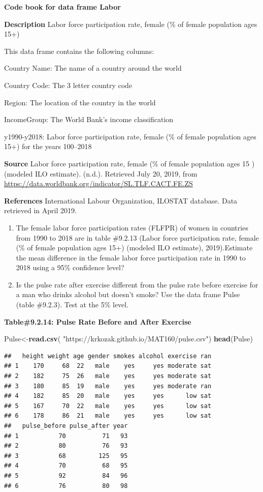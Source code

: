 \documentclass[
]{book}
\newenvironment{Shaded}{\begin{snugshade}}{\end{snugshade}}
\newcommand{\KeywordTok}[1]{\textcolor[rgb]{0.13,0.29,0.53}{\textbf{#1}}}
\newcommand{\NormalTok}[1]{#1}
\newcommand{\StringTok}[1]{\textcolor[rgb]{0.31,0.60,0.02}{#1}}
\begin{document}
\textbf{Code book for data frame Labor}

\textbf{Description}
Labor force participation rate, female (\% of female population ages 15+)

This data frame contains the following columns:

Country Name: The name of a country around the world

Country Code: The 3 letter country code

Region: The location of the country in the world

IncomeGroup: The World Bank's income classification

y1990-y2018: Labor force participation rate, female (\% of female population ages 15+) for the years 100--2018

\textbf{Source}
Labor force participation rate, female (\% of female population ages 15 ) (modeled ILO estimate). (n.d.). Retrieved July 20, 2019, from \url{https://data.worldbank.org/indicator/SL.TLF.CACT.FE.ZS}

\textbf{References}
International Labour Organization, ILOSTAT database. Data retrieved in April 2019.

\begin{enumerate}
\def\labelenumi{\arabic{enumi}.}
\setcounter{enumi}{9}
\item
  The female labor force participation rates (FLFPR) of women in countries from 1990 to 2018 are in table \#9.2.13 (Labor force participation rate, female (\% of female population ages 15+) (modeled ILO estimate), 2019).Estimate the mean difference in the female labor force participation rate in 1990 to 2018 using a 95\% confidence level?
\item
  Is the pulse rate after exercise different from the pulse rate before exercise for a man who drinks alcohol but doesn't smoke? Use the data frame Pulse (table \#9.2.3). Test at the 5\% level.
\end{enumerate}

\textbf{Table\#9.2.14: Pulse Rate Before and After Exercise}

\begin{Shaded}
\begin{Highlighting}[]
\NormalTok{Pulse<-}\KeywordTok{read.csv}\NormalTok{(}
  \StringTok{"https://krkozak.github.io/MAT160/pulse.csv"}\NormalTok{)}
\KeywordTok{head}\NormalTok{(Pulse)}
\end{Highlighting}
\end{Shaded}

\begin{verbatim}
##   height weight age gender smokes alcohol exercise ran
## 1    170     68  22   male    yes     yes moderate sat
## 2    182     75  26   male    yes     yes moderate sat
## 3    180     85  19   male    yes     yes moderate ran
## 4    182     85  20   male    yes     yes      low sat
## 5    167     70  22   male    yes     yes      low sat
## 6    178     86  21   male    yes     yes      low sat
##   pulse_before pulse_after year
## 1           70          71   93
## 2           80          76   93
## 3           68         125   95
## 4           70          68   95
## 5           92          84   96
## 6           76          80   98
\end{verbatim}
\end{document}
